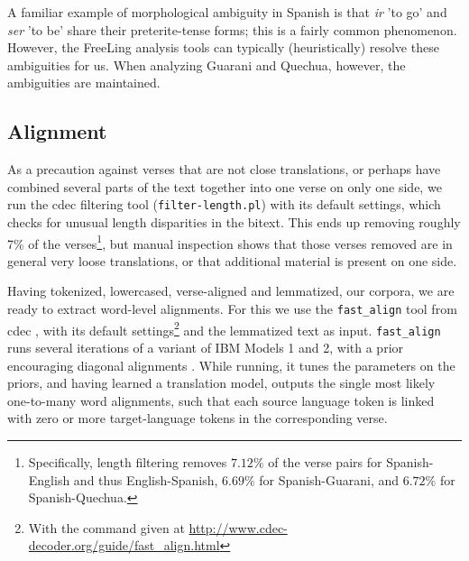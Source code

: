 A familiar example of morphological ambiguity in Spanish is that \emph{ir} 'to
go' and \emph{ser} 'to be' share their preterite-tense forms; this is a fairly
common phenomenon. However, the FreeLing analysis tools can typically
(heuristically) resolve these ambiguities for us. When analyzing Guarani and
Quechua, however, the ambiguities are maintained.

\subsection{Alignment}
As a precaution against verses that are not close translations, or perhaps have
combined several parts of the text together into one verse on only one side, we
run the cdec filtering tool (\texttt{filter-length.pl}) with its default
settings, which checks for unusual length disparities in the bitext. This ends
up removing roughly 7\% of the verses\footnote{Specifically, length filtering
removes $7.12\%$ of the verse pairs for Spanish-English and thus
English-Spanish, $6.69\%$ for Spanish-Guarani, and $6.72\%$ for
Spanish-Quechua.}, but manual inspection shows that those verses removed are in
general very loose translations, or that additional material is present on one
side.

Having tokenized, lowercased, verse-aligned and lemmatized, our corpora, we are
ready to extract word-level alignments.
For this we use the \texttt{fast\_align} tool from cdec
\cite{dyer-EtAl:2010:Demos}, with its default settings\footnote{With the
command given at \url{http://www.cdec-decoder.org/guide/fast_align.html}} and
the lemmatized text as input.
\texttt{fast\_align} runs several iterations of a variant of IBM Models 1 and
2, with a prior encouraging diagonal alignments
\cite{dyer-EtAl:2011:ACL-HLT2011}. While running, it tunes the parameters on
the priors, and having learned a translation model, outputs the single most
likely one-to-many word alignments, such that each source language token is
linked with zero or more target-language tokens in the corresponding verse.






